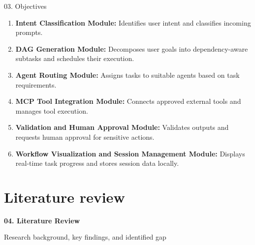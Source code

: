\documentclass[aspectratio=169,10pt]{beamer}
\begin{document}
\begin{frame}[t]{03. Objectives}
\vspace{0.15cm}
\begin{center}
\begin{minipage}{0.86\linewidth}
\normalsize
\begin{enumerate}\setlength{\itemsep}{8pt}\setlength{\leftmargin}{0.28in}
  \item \textbf{Intent Classification Module:} Identifies user intent and classifies incoming prompts.
  \item \textbf{DAG Generation Module:} Decomposes user goals into dependency-aware subtasks and schedules their execution.
  \item \textbf{Agent Routing Module:} Assigns tasks to suitable agents based on task requirements.
  \item \textbf{MCP Tool Integration Module:} Connects approved external tools and manages tool execution.
  \item \textbf{Validation and Human Approval Module:} Validates outputs and requests human approval for sensitive actions.
  \item \textbf{Workflow Visualization and Session Management Module:} Displays real-time task progress and stores session data locally.
\end{enumerate}
\end{minipage}
\end{center}
\end{frame}

\section{Literature review}
\def\mainliteraturereview{}
\begin{frame}[plain]
  \vfill
  \begin{center}
    {\color{lavenderDark}\fontsize{25}{30}\selectfont\bfseries 04. Literature Review\par}
    \vspace{0.45em}
    {\color{prismTeal!85!black}\large Research background, key findings, and identified gap}
  \end{center}
  \vfill
\end{frame}
\end{document}
